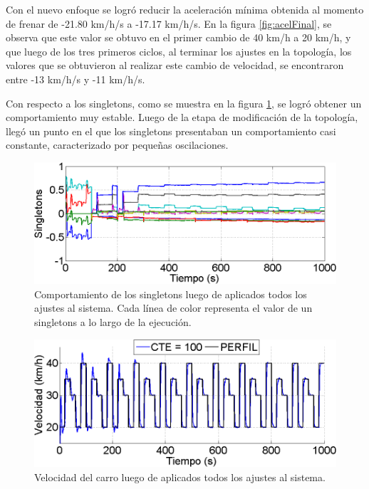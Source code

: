 Con el nuevo enfoque se logró reducir la aceleración mínima obtenida al momento de frenar de -21.80 km/h/s a -17.17 km/h/s. En la figura \ref{fig:acelFinal}, se observa que este valor se obtuvo en el primer cambio de 40 km/h a 20 km/h, y que luego de los tres primeros ciclos, al terminar los ajustes en la topología, los valores que se obtuvieron al realizar este cambio de velocidad, se encontraron entre -13 km/h/s y -11 km/h/s.
 
Con respecto a los singletons, como se muestra en la figura \ref{fig:singleFin}, se logró obtener un comportamiento muy estable. Luego de la etapa de modificación de la topología, llegó un punto en el que los singletons presentaban un comportamiento casi constante, caracterizado por pequeñas oscilaciones.


\begin{figure}[h]
\centering
\includegraphics[width=0.6\linewidth,type=png,ext=.png,read=.png]{figures/singleFin}
\caption{Comportamiento de los singletons luego de aplicados todos los ajustes al sistema. Cada línea de color representa el valor de un singletons a lo largo de la ejecución.}
\label{fig:singleFin}
\end{figure} 


\begin{figure}[h]
\centering
\includegraphics[width=0.6\linewidth,type=png,ext=.png,read=.png]{figures/velFin}
\caption{Velocidad del carro luego de aplicados todos los ajustes al sistema.}
\label{fig:velFin}
\end{figure} 



